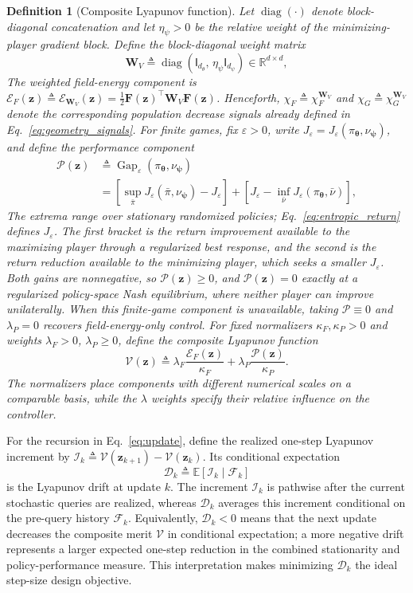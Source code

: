 \documentclass{article}
\newtheorem{definition}{Definition}
\theoremstyle{remark}
\newcommand{\R}{\mathbb{R}}
\newcommand{\E}{\mathbb{E}}
\newcommand{\Id}{\mathsf{I}}
\newcommand{\diag}{\operatorname{diag}}
\newcommand{\bz}{\boldsymbol{z}}
\newcommand{\btheta}{\boldsymbol{\theta}}
\newcommand{\bpsi}{\boldsymbol{\psi}}
\newcommand{\bW}{\boldsymbol{W}}
\newcommand{\bF}{\boldsymbol{F}}
\newcommand{\Vk}{\mathcal{V}}
\newcommand{\cE}{\mathcal{E}}
\newcommand{\cP}{\mathcal{P}}
\begin{document}
\begin{definition}[Composite Lyapunov function]\label{def:Lyap}
Let $\diag(\cdot)$ denote block-diagonal concatenation and let $\eta_{\psi}>0$ be the relative weight of the minimizing-player gradient block.
Define the block-diagonal weight matrix
\[
\bW_{V}\triangleq\diag(\Id_{d_{\theta}},\,\eta_{\psi}\Id_{d_{\psi}})\in\R^{d\times d},
\]
The weighted field-energy component is $\cE_{F}(\bz)\triangleq\cE_{\bW_V}(\bz)=\tfrac12\bF(\bz)^{\top}\bW_{V}\bF(\bz)$.
Henceforth, $\chi_F\triangleq\chi_F^{\bW_V}$ and $\chi_G\triangleq\chi_G^{\bW_V}$ denote the corresponding population decrease signals already defined in Eq.~\eqref{eq:geometry_signals}.
For finite games, fix $\varepsilon>0$, write $J_\varepsilon=J_\varepsilon(\pi_{\btheta},\nu_{\bpsi})$, and define the performance component
\[
\begin{aligned}
\cP(\bz)
&\triangleq\operatorname{Gap}_{\varepsilon}(\pi_{\btheta},\nu_{\bpsi})\\
&=\left[\sup_{\bar\pi}J_{\varepsilon}(\bar\pi,\nu_{\bpsi})-J_\varepsilon\right]
+\left[J_\varepsilon-\inf_{\bar\nu}J_{\varepsilon}(\pi_{\btheta},\bar\nu)\right],
\end{aligned}
\]
The extrema range over stationary randomized policies; Eq.~\eqref{eq:entropic_return} defines $J_\varepsilon$.
The first bracket is the return improvement available to the maximizing player through a regularized best response, and the second is the return reduction available to the minimizing player, which seeks a smaller $J_\varepsilon$.
Both gains are nonnegative, so $\cP(\bz)\ge0$, and $\cP(\bz)=0$ exactly at a regularized policy-space Nash equilibrium, where neither player can improve unilaterally.
When this finite-game component is unavailable, taking $\cP\equiv0$ and $\lambda_P=0$ recovers field-energy-only control.
For fixed normalizers $\kappa_{F},\kappa_{P}>0$ and weights $\lambda_{F}>0$, $\lambda_{P}\ge0$, define the composite Lyapunov function
\begin{equation}\label{eq:Vdef}
\Vk(\bz)
\triangleq
\lambda_{F}\frac{\cE_{F}(\bz)}{\kappa_{F}}
+
\lambda_{P}\frac{\cP(\bz)}{\kappa_{P}}.
\end{equation}
The normalizers place components with different numerical scales on a comparable basis, while the $\lambda$ weights specify their relative influence on the controller.
\end{definition}

For the recursion in Eq.~\eqref{eq:update}, define the realized one-step Lyapunov increment by $\mathscr I_k\triangleq\Vk(\bz_{k+1})-\Vk(\bz_k)$.
Its conditional expectation
\[
\mathscr D_k\triangleq\E[\mathscr I_k\mid\mathscr F_k]
\]
is the Lyapunov drift at update $k$.
The increment $\mathscr I_k$ is pathwise after the current stochastic queries are realized, whereas $\mathscr D_k$ averages this increment conditional on the pre-query history $\mathscr F_k$.
Equivalently, $\mathscr D_k<0$ means that the next update decreases the composite merit $\Vk$ in conditional expectation; a more negative drift represents a larger expected one-step reduction in the combined stationarity and policy-performance measure.
This interpretation makes minimizing $\mathscr D_k$ the ideal step-size design objective.
\end{document}
